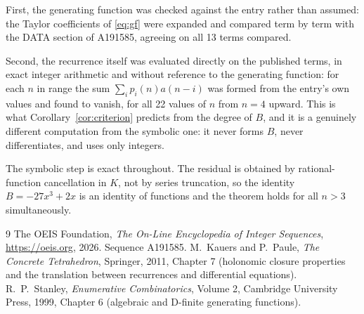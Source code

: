 \documentclass[11pt,a4paper]{article}
\theoremstyle{plain}
\theoremstyle{definition}
\begin{document}
First, the generating function was checked against the entry rather than assumed: the
Taylor coefficients of \eqref{eq:gf} were expanded and compared term by term with the DATA
section of A191585, agreeing on all 13 terms compared.

Second, the recurrence itself was evaluated directly on the published terms, in exact
integer arithmetic and without reference to the generating function: for each $n$ in range
the sum $\sum_{i}p_{i}(n)a(n-i)$ was formed from the entry's own values and found to
vanish, for all 22 values of $n$ from $n=4$ upward. This is what
Corollary~\ref{cor:criterion} predicts from the degree of $B$, and it is a genuinely
different computation from the symbolic one: it never forms $B$, never differentiates, and
uses only integers.

The symbolic step is exact throughout. The residual is obtained by rational-function
cancellation in $K$, not by series truncation, so the identity $B=- 27 x^{3} + 2 x$ is an
identity of functions and the theorem holds for all $n>3$ simultaneously.

\begin{thebibliography}{9}
 The OEIS Foundation, \emph{The On-Line Encyclopedia of Integer Sequences},
\url{https://oeis.org}, 2026. Sequence A191585.
 M.~Kauers and P.~Paule, \emph{The Concrete Tetrahedron}, Springer, 2011,
Chapter 7 (holonomic closure properties and the translation between recurrences and
differential equations).
 R.~P.~Stanley, \emph{Enumerative Combinatorics}, Volume 2, Cambridge
University Press, 1999, Chapter 6 (algebraic and D-finite generating functions).
\end{thebibliography}
\end{document}
